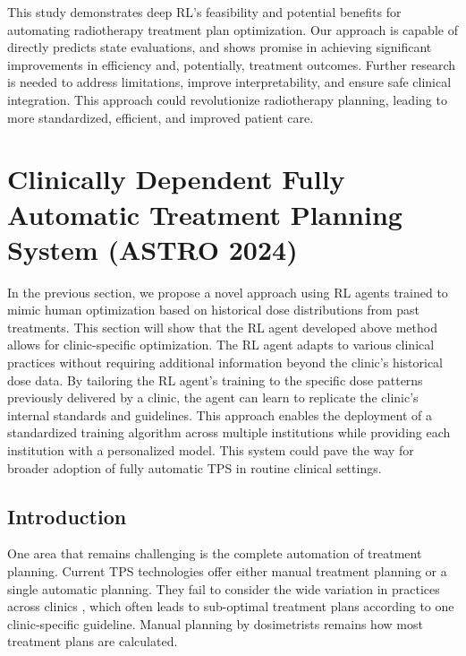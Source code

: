 This study demonstrates deep RL's feasibility and potential benefits for automating radiotherapy treatment plan optimization.
Our approach is capable of directly predicts state evaluations, and shows promise in achieving significant improvements in efficiency and, potentially, treatment outcomes.
Further research is needed to address limitations, improve interpretability, and ensure safe clinical integration.
This approach could revolutionize radiotherapy planning, leading to more standardized, efficient, and improved patient care.






\section{Clinically Dependent Fully Automatic Treatment Planning System (ASTRO 2024)}
In the previous section, we propose a novel approach using RL agents trained to mimic human optimization based on historical dose distributions from past treatments.
This section will show that the RL agent developed above method allows for clinic-specific optimization.
The RL agent adapts to various clinical practices without requiring additional information beyond the clinic's historical dose data.
By tailoring the RL agent's training to the specific dose patterns previously delivered by a clinic, the agent can learn to replicate the clinic's internal standards and guidelines.
This approach enables the deployment of a standardized training algorithm across multiple institutions while providing each institution with a personalized model. 
This system could pave the way for broader adoption of fully automatic TPS in routine clinical settings.

\subsection{Introduction}
One area that remains challenging is the complete automation of treatment planning.
Current TPS technologies offer either manual treatment planning or a single automatic planning.
They fail to consider the wide variation in practices across clinics \cite{Krayenbuehl2018}, which often leads to sub-optimal treatment plans according to one clinic-specific guideline.
Manual planning by dosimetrists remains how most treatment plans are calculated.

